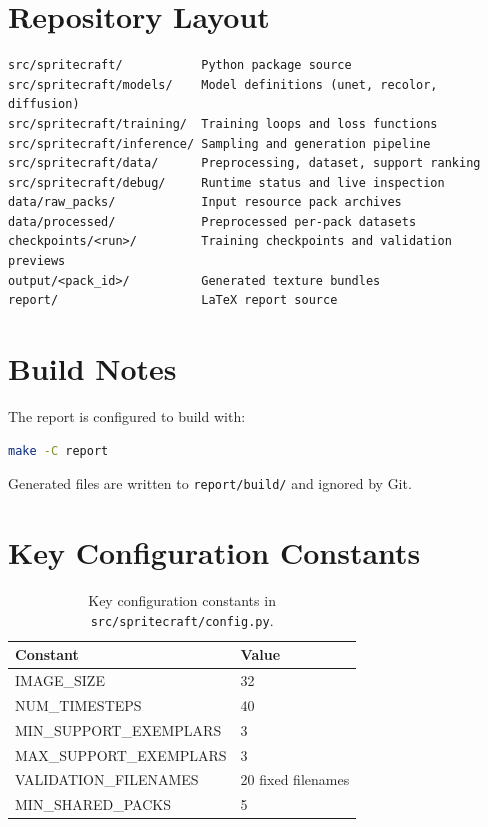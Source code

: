 \section{Repository Layout}

\begin{lstlisting}[caption={Key project paths.}]
src/spritecraft/           Python package source
src/spritecraft/models/    Model definitions (unet, recolor, diffusion)
src/spritecraft/training/  Training loops and loss functions
src/spritecraft/inference/ Sampling and generation pipeline
src/spritecraft/data/      Preprocessing, dataset, support ranking
src/spritecraft/debug/     Runtime status and live inspection
data/raw_packs/            Input resource pack archives
data/processed/            Preprocessed per-pack datasets
checkpoints/<run>/         Training checkpoints and validation previews
output/<pack_id>/          Generated texture bundles
report/                    LaTeX report source
\end{lstlisting}

\section{Build Notes}

The report is configured to build with:

\begin{lstlisting}[language=bash]
make -C report
\end{lstlisting}

Generated files are written to \texttt{report/build/} and ignored by Git.

\section{Key Configuration Constants}

\begin{table}[htbp]
    \centering
    \caption{Key configuration constants in \texttt{src/spritecraft/config.py}.}
    \begin{tabular}{@{}ll@{}}
        \toprule
        Constant & Value \\
        \midrule
        IMAGE\_SIZE & 32 \\
        NUM\_TIMESTEPS & 40 \\
        MIN\_SUPPORT\_EXEMPLARS & 3 \\
        MAX\_SUPPORT\_EXEMPLARS & 3 \\
        VALIDATION\_FILENAMES & 20 fixed filenames \\
        MIN\_SHARED\_PACKS & 5 \\
        \bottomrule
    \end{tabular}
\end{table}
